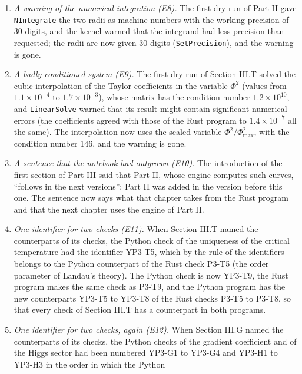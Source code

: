 \documentclass[
  10pt,
]{article}
\begin{document}
\begin{enumerate}
  side, 880 points wide; the printed copy cut the right panel. The
  panels now stand one above the other, each 460 points wide, and the
  notebook was built and evaluated again.
\item
  \emph{A warning of the numerical integration (E8).} The first dry run
  of Part II gave \texttt{NIntegrate} the two radii as machine numbers
  with the working precision of 30 digits, and the kernel warned that
  the integrand had less precision than requested; the radii are now
  given 30 digits (\texttt{SetPrecision}), and the warning is gone.
\item
  \emph{A badly conditioned system (E9).} The first dry run of Section
  III.T solved the cubic interpolation of the Taylor coefficients in the
  variable \(\Phi^2\) (values from \(1.1\times10^{-4}\) to
  \(1.7\times10^{-3}\)), whose matrix has the condition number
  \(1.2\times10^{10}\), and \texttt{LinearSolve} warned that its result
  might contain significant numerical errors (the coefficients agreed
  with those of the Rust program to \(1.4\times10^{-7}\) all the same).
  The interpolation now uses the scaled variable
  \(\Phi^2/\Phi^2_{\max}\), with the condition number 146, and the
  warning is gone.
\item
  \emph{A sentence that the notebook had outgrown (E10).} The
  introduction of the first section of Part III said that Part II, whose
  engine computes such curves, ``follows in the next versions''; Part II
  was added in the version before this one. The sentence now says what
  that chapter takes from the Rust program and that the next chapter
  uses the engine of Part II.
\item
  \emph{One identifier for two checks (E11).} When Section III.T named
  the counterparts of its checks, the Python check of the uniqueness of
  the critical temperature had the identifier YP3-T5, which by the rule
  of the identifiers belongs to the Python counterpart of the Rust check
  P3-T5 (the order parameter of Landau's theory). The Python check is
  now YP3-T9, the Rust program makes the same check as P3-T9, and the
  Python program has the new counterparts YP3-T5 to YP3-T8 of the Rust
  checks P3-T5 to P3-T8, so that every check of Section III.T has a
  counterpart in both programs.
\item
  \emph{One identifier for two checks, again (E12).} When Section III.G
  named the counterparts of its checks, the Python checks of the
  gradient coefficient and of the Higgs sector had been numbered YP3-G1
  to YP3-G4 and YP3-H1 to YP3-H3 in the order in which the Python

\end{enumerate}
\end{document}
